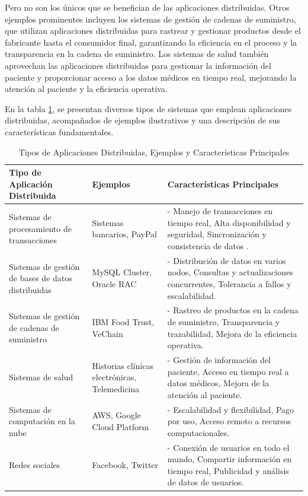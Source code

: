 \noindent
Pero no son los únicos que se benefician de las aplicaciones distribuidas. Otros ejemplos prominentes incluyen los sistemas de gestión de cadenas de suministro, que utilizan aplicaciones distribuidas para rastrear y gestionar productos desde el fabricante hasta el consumidor final, garantizando la eficiencia en el proceso y la transparencia en la cadena de suministro. Los sistemas de salud también aprovechan las aplicaciones distribuidas para gestionar la información del paciente y proporcionar acceso a los datos médicos en tiempo real, mejorando la atención al paciente y la eficiencia operativa.

En la tabla \ref{tabla:aplicaciones-distribuidas}, se presentan diversos tipos de sistemas que emplean aplicaciones distribuidas, acompañados de ejemplos ilustrativos y una descripción de sus características fundamentales.

\begin{table}[h!]
	\centering
	\caption{Tipos de Aplicaciones Distribuidas, Ejemplos y Características Principales}	
	\begin{tabular}{|p{4cm}|p{3cm}|p{8cm}|}
		\hline
		\textbf{Tipo de Aplicación Distribuida} & \textbf{Ejemplos} & \textbf{Características Principales} \\
		\hline
		Sistemas de procesamiento de transacciones & Sistemas bancarios, PayPal & - Manejo de transacciones en tiempo real, Alta disponibilidad y seguridad, Sincronización y consistencia de datos \cite{Almadani2023}. \\
		\hline
		Sistemas de gestión de bases de datos distribuidas & MySQL Cluster, Oracle RAC & - Distribución de datos en varios nodos, Consultas y actualizaciones concurrentes, Tolerancia a fallos y escalabilidad. \\
		\hline
		Sistemas de gestión de cadenas de suministro & IBM Food Trust, VeChain & - Rastreo de productos en la cadena de suministro, Transparencia y trazabilidad, Mejora de la eficiencia operativa. \\
		\hline
		Sistemas de salud & Historias clínicas electrónicas, Telemedicina & - Gestión de información del paciente, Acceso en tiempo real a datos médicos, Mejora de la atención al paciente. \\
		\hline
		Sistemas de computación en la nube & AWS, Google Cloud Platform & - Escalabilidad y flexibilidad, Pago por uso, Acceso remoto a recursos computacionales. \\
		\hline
		Redes sociales & Facebook, Twitter & - Conexión de usuarios en todo el mundo, Compartir información en tiempo real, Publicidad y análisis de datos de usuarios. \\
		\hline
	\end{tabular}
	\label{tabla:aplicaciones-distribuidas}
\end{table}

